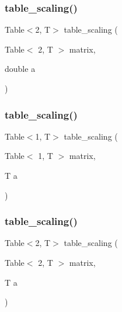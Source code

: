 \mbox{\label{supplementary_functions_8h_a6426196fb732830b7cae464a93ee2b15}} 
\subsubsection{\texorpdfstring{table\_scaling()}{table\_scaling()}\hspace{0.1cm}{\footnotesize\ttfamily [2/4]}}
{\footnotesize\ttfamily Table$<$2, T$>$ table\+\_\+scaling (\begin{DoxyParamCaption}\item[{Table$<$ 2, T $>$}]{matrix,  }\item[{double}]{a }\end{DoxyParamCaption})\hspace{0.3cm}{\ttfamily [inline]}}

\mbox{\label{supplementary_functions_8h_a5cd1e11e92aa6488e65b7ee7ef8acfb4}} 
\subsubsection{\texorpdfstring{table\_scaling()}{table\_scaling()}\hspace{0.1cm}{\footnotesize\ttfamily [3/4]}}
{\footnotesize\ttfamily Table$<$1, T$>$ table\+\_\+scaling (\begin{DoxyParamCaption}\item[{Table$<$ 1, T $>$}]{matrix,  }\item[{T}]{a }\end{DoxyParamCaption})\hspace{0.3cm}{\ttfamily [inline]}}

\mbox{\label{supplementary_functions_8h_a33371416e7cbc73fd7af9a9df5c7c2f7}} 
\subsubsection{\texorpdfstring{table\_scaling()}{table\_scaling()}\hspace{0.1cm}{\footnotesize\ttfamily [4/4]}}
{\footnotesize\ttfamily Table$<$2, T$>$ table\+\_\+scaling (\begin{DoxyParamCaption}\item[{Table$<$ 2, T $>$}]{matrix,  }\item[{T}]{a }\end{DoxyParamCaption})\hspace{0.3cm}{\ttfamily [inline]}}

